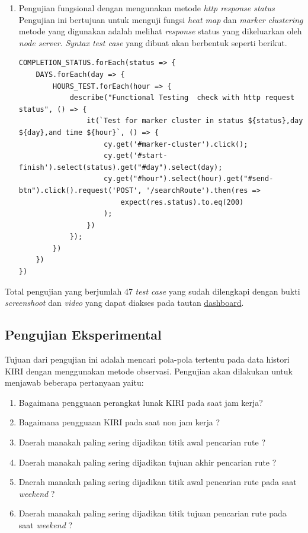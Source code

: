 \begin{enumerate}
	
	\item Pengujian fungsional dengan mengunakan metode \textit{http response status} \\
    Pengujian ini bertujuan untuk menguji fungsi \textit{heat map} dan \textit{marker clustering} metode yang digunakan adalah melihat \textit{response} status yang dikeluarkan oleh \textit{node server}. \textit{Syntax test case} yang dibuat akan berbentuk seperti berikut.\\
    \begin{lstlisting}[label=functional_test_case , caption=Funcional Test Case ]
COMPLETION_STATUS.forEach(status => {
    DAYS.forEach(day => {
        HOURS_TEST.forEach(hour => {
            describe("Functional Testing  check with http request status", () => {
                it(`Test for marker cluster in status ${status},day ${day},and time ${hour}`, () => {
                    cy.get('#marker-cluster').click();
                    cy.get('#start-finish').select(status).get("#day").select(day);
                    cy.get("#hour").select(hour).get("#send-btn").click().request('POST', '/searchRoute').then(res =>
                        expect(res.status).to.eq(200)
                    );
                })
            });
        })
    })
})
    \end{lstlisting}
    
\end{enumerate}

Total pengujian yang berjumlah 47 \textit{test case} yang sudah dilengkapi dengan bukti \textit{screenshoot} dan \textit{video} yang dapat diakses pada tautan \href{https://dashboard.cypress.io/projects/cgtb3m/runs/1/overview}{dashboard}.

\subsection{Pengujian Eksperimental}
\label{subsec: pengujian}
Tujuan dari pengujian ini adalah mencari pola-pola tertentu pada data histori KIRI dengan menggunakan metode observasi. Pengujian akan dilakukan untuk menjawab beberapa pertanyaan yaitu:
\begin{enumerate}
    \item Bagaimana pengguaan perangkat lunak KIRI pada saat jam kerja?
    \item Bagaimana pengguaan KIRI pada saat non jam kerja ?
    \item  Daerah manakah  paling sering dijadikan titik awal pencarian rute ?
    \item  Daerah manakah  paling sering dijadikan tujuan akhir pencarian rute ?
    \item Daerah manakah  paling sering dijadikan titik awal pencarian rute pada saat \textit{weekend} ?
    \item Daerah manakah  paling sering dijadikan titik tujuan pencarian rute pada saat \textit{weekend} ?
\end{enumerate}

